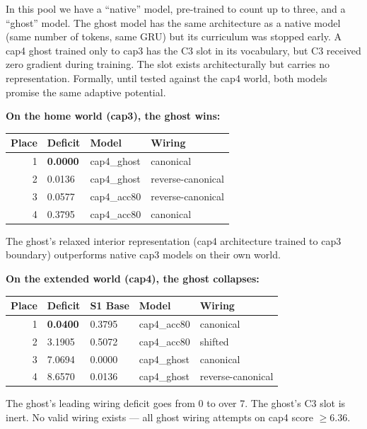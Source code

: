 \documentclass[12pt, a4paper]{article}
\begin{document}
In this pool we have a ``native'' model, pre-trained to count up to three, and
a ``ghost'' model. The ghost model has the same architecture as a native model
(same number of tokens, same GRU) but its curriculum was stopped early. A cap4
ghost trained only to cap3 has the C3 slot in its vocabulary, but C3 received
zero gradient during training. The slot exists architecturally but carries no
representation. Formally, until tested against the cap4 world, both models
promise the same adaptive potential.

\textbf{On the home world (cap3), the ghost wins:}

\begin{center}
\begin{tabular}{rlll}
\toprule
Place & Deficit & Model & Wiring \\
\midrule
1 & \textbf{0.0000} & cap4\_ghost  & canonical \\
2 & 0.0136          & cap4\_ghost  & reverse-canonical \\
3 & 0.0577          & cap4\_acc80  & reverse-canonical \\
4 & 0.3795          & cap4\_acc80  & canonical \\
\bottomrule
\end{tabular}
\end{center}

The ghost's relaxed interior representation (cap4 architecture trained to cap3
boundary) outperforms native cap3 models on their own world.

\textbf{On the extended world (cap4), the ghost collapses:}

\begin{center}
\begin{tabular}{rllll}
\toprule
Place & Deficit & S1 Base & Model & Wiring \\
\midrule
1 & \textbf{0.0400} & 0.3795 & cap4\_acc80  & canonical \\
2 & 3.1905          & 0.5072 & cap4\_acc80  & shifted \\
3 & 7.0694          & 0.0000 & cap4\_ghost  & canonical \\
4 & 8.6570          & 0.0136 & cap4\_ghost  & reverse-canonical \\
\bottomrule
\end{tabular}
\end{center}

The ghost's leading wiring deficit goes from 0 to over 7. The ghost's C3 slot
is inert. No valid wiring exists --- all ghost wiring attempts on cap4 score
$\geq 6.36$.
\end{document}
